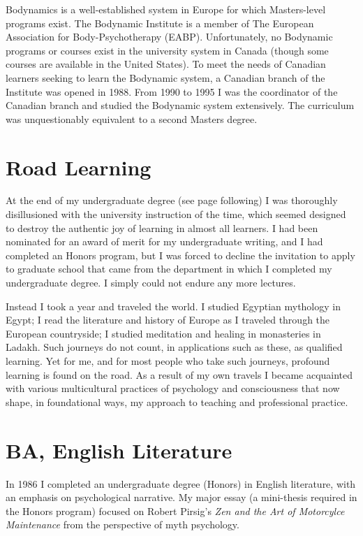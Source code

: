 \documentclass[10pt,DIV09,letterpaper,oneside,headsepline]{scrreprt}
\begin{document}
Bodynamics is a well-established system in Europe for which Masters-level programs exist. The Bodynamic Institute is a member of The European Association for Body-Psychotherapy (EABP). Unfortunately, no Bodynamic programs or courses exist in the university system in Canada (though some courses are available in the United States). To meet the needs of Canadian learners seeking to learn the Bodynamic system, a Canadian branch of the Institute was opened in 1988. From 1990 to 1995 I was the coordinator of the Canadian branch and studied the Bodynamic system extensively. The curriculum was unquestionably equivalent to a second Masters degree.

\section{Road Learning}

At the end of my undergraduate degree (see page following) I was thoroughly disillusioned with the university instruction of the time, which seemed designed to destroy the authentic joy of learning in almost all learners. I had been nominated for an award of merit for my undergraduate writing, and I had completed an Honors program, but I was forced to decline the invitation to apply to graduate school that came from the department in which I completed my undergraduate degree. I simply could not endure any more lectures.

Instead I took a year and traveled the world. I studied Egyptian mythology in Egypt; I read the literature and history of Europe as I traveled through the European countryside; I studied meditation and healing in monasteries in Ladakh. Such journeys do not count, in applications such as these, as qualified learning. Yet for me, and for most people who take such journeys, profound learning is found on the road. As a result of my own travels I became acquainted with various multicultural practices of psychology and consciousness that now shape, in foundational ways, my approach to teaching and professional practice.

\section{BA, English Literature}

In 1986 I completed an undergraduate degree (Honors) in English literature, with an emphasis on psychological narrative. My major essay (a mini-thesis required in the Honors program) focused on Robert Pirsig's \textit{Zen and the Art of Motorcylce Maintenance} from the perspective of myth psychology.
\end{document}
